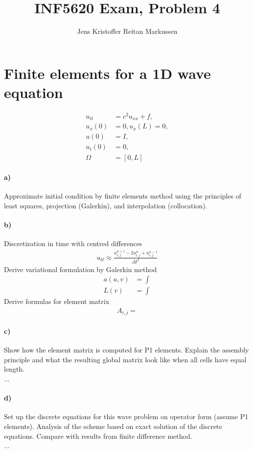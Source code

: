 \documentclass[11pt,a4paper]{article}
\author{Jens Kristoffer Reitan Markussen}
\title{INF5620 Exam, Problem 4}
\begin{document}
\maketitle
\section*{Finite elements for a 1D wave equation}
\begin{align}
u_{tt} &= c^2u_{xx} + f,\\
u_{x}(0) &= 0, u_{x}(L) = 0,\\
u(0) &= I,\\
u_{t}(0) &= 0, \\ 
\Omega &= [0,L]
\end{align}
\paragraph*{a)}
Approximate initial condition by finite elements method using the principles of least squares, projection (Galerkin), and interpolation (collocation).

\paragraph*{b)}
Discretization in time with centred differences
\begin{align}
u_{tt} \approx \frac{u^{n+1}_{i,j}-2u^{n}_{i,j}+u^{n-1}_{i,j}}{\Delta t^2}
\end{align}
Derive variational formulation by Galerkin method
\begin{align}
a(u,v) &= \int \\
L(v) &= \int
\end{align}
Derive formulas for element matrix
\begin{align}
A_{i,j} =
\end{align}

\paragraph*{c)}
Show how the element matrix is computed for P1 elements. Explain the assembly principle and what the resulting global matrix look like when all cells have equal length.\\ 

...

\paragraph*{d)}
Set up the discrete equations for this wave problem on operator form (assume P1 elements). Analysis of the scheme based on exact solution of the discrete equations. Compare with results from finite difference method. \\

...
\end{document}
